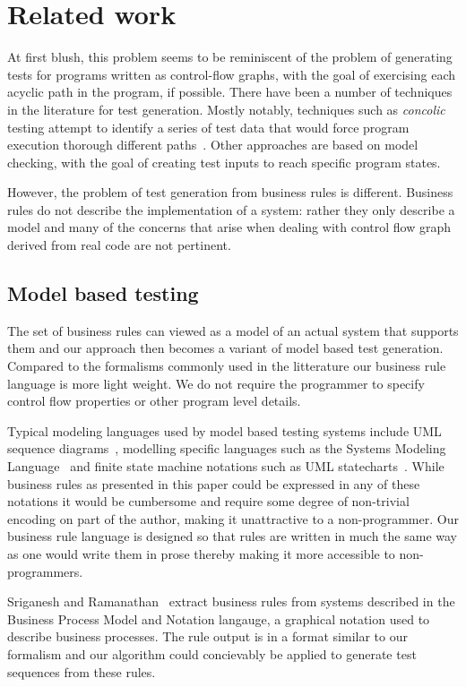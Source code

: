 \section{Related work}

At first blush, this problem seems to be reminiscent of the problem of
generating tests for programs written as control-flow graphs, with the
goal of exercising each acyclic path in the program, if possible.
There have been a number of techniques in the literature for test
generation. Mostly notably, techniques such as \textit{concolic}
testing attempt to identify a series of test data that would force
program execution thorough different paths~\cite{dart, concolic}.  Other
approaches are based on model checking, with the goal of creating test
inputs to reach specific program states.

However, the problem of test generation from business rules is
different. Business rules do not describe the implementation of a
system: rather they only describe a model and many of the concerns
that arise when dealing with control flow graph derived from real code
are not pertinent.

\subsection{Model based testing}

The set of business rules can viewed as a model of an actual system
that supports them and our approach then becomes a variant of model
based test generation. Compared to the formalisms commonly used in the
litterature our business rule language is more light weight. We do not
require the programmer to specify control flow properties or other
program level details.

Typical modeling languages used by model based testing systems include
UML sequence diagrams~\cite{nayak2009}, modelling specific languages
such as the Systems Modeling Language~\cite{friedenthal2011} and
finite state machine notations such as UML
statecharts~\cite{offhut99}. While business rules as presented in this
paper could be expressed in any of these notations it would be
cumbersome and require some degree of non-trivial encoding on part of
the author, making it unattractive to a non-programmer. Our business
rule language is designed so that rules are written in much the same
way as one would write them in prose thereby making it more accessible
to non-programmers.

Sriganesh and Ramanathan~\cite{sriganesh2012} extract business rules
from systems described in the Business Process Model and Notation
langauge, a graphical notation used to describe business
processes. The rule output is in a format similar to our formalism and
our algorithm could concievably be applied to generate test sequences
from these rules.

